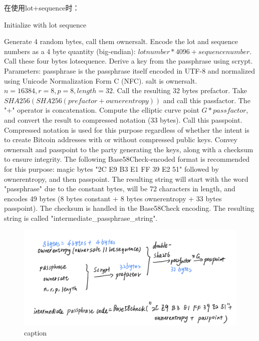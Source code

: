 在使用lot+sequence时：  

\begin{algorithm}[tbp]\footnotesize
\caption{Initialize with lot sequence}
  	\begin{algorithmic}[1]
	    \STATE Generate 4 random bytes, call them ownersalt. 
		\STATE Encode the lot and sequence numbers as a 4 byte quantity (big-endian): $lotnumber * 4096 + sequencenumber$. Call these four bytes lotsequence.
		\STATE Derive a key from the passphrase using scrypt. 
		\STATE Parameters: passphrase is the passphrase itself encoded in UTF-8 and normalized using Unicode Normalization Form C (NFC). salt is ownersalt. $n=16384, r=8, p=8, length=32$.
		\STATE Call the resulting 32 bytes prefactor.
		\STATE Take $SHA256(SHA256(prefactor + ownerentropy))$ and call this passfactor. The "+" operator is concatenation.
		\STATE Compute the elliptic curve point $G * passfactor$, and convert the result to compressed notation (33 bytes). Call this passpoint. Compressed notation is used for this purpose regardless of whether the intent is to create Bitcoin addresses with or without compressed public keys.
		\STATE Convey ownersalt and passpoint to the party generating the keys, along with a checksum to ensure integrity.
		\STATE The following Base58Check-encoded format is recommended for this purpose: magic bytes "2C E9 B3 E1 FF 39 E2 51" followed by ownerentropy, and then passpoint. The resulting string will start with the word "passphrase" due to the constant bytes, will be 72 characters in length, and encodes 49 bytes (8 bytes constant + 8 bytes ownerentropy + 33 bytes passpoint). The checksum is handled in the Base58Check encoding. The resulting string is called "intermediate_passphrase_string".

    \end{algorithmic}
\end{algorithm}


\begin{figure}[h]
\centering
\includegraphics[width=.7\textwidth]{./im-code1.png}
\caption{caption}\label{fig-parsesig}
\end{figure}

